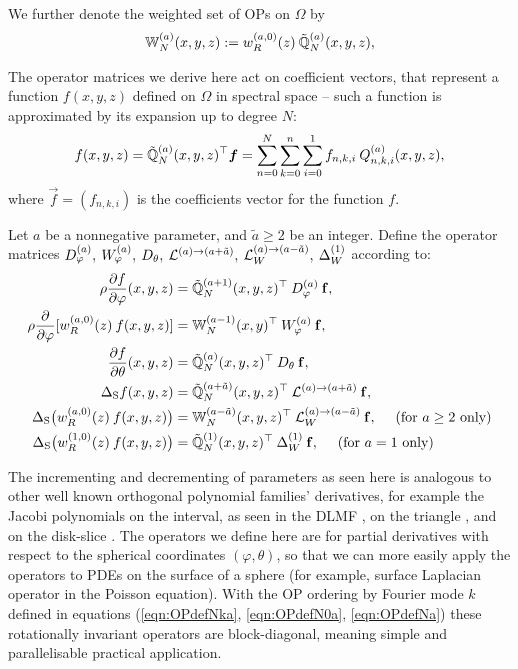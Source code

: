 \documentclass[11pt, oneside]{article}   	%
\begin{document}
We further denote the weighted set of OPs on $\Omega$ by 
\begin{align*}
	\mathbb{W}_N^{(a)}(x,y,z) := w_R^{(a,0)}(z) \: {\mathbb{\tilde Q}}^{(a)}_{N}(x,y,z),
\end{align*}

The operator matrices we derive here act on coefficient vectors, that represent a function $f(x,y,z)$ defined on $\Omega$ in spectral space -- such a function is approximated by its expansion up to degree $N$: 
\begin{align*}
	f(x,y,z) = {\mathbb{\tilde Q}}^{(a)}_{N}(x,y,z)^\top \bm{f} = \sum_{n=0}^{N} \sum_{k=0}^{n} \sum_{i=0}^{1} f_{n,k,i} \: Q_{n,k,i}^{(a)}(x,y,z),
\end{align*}
where $\vec f = (f_{n,k,i})$ is the coefficients vector for the function $f$.

\begin{definition}\label{def:differentialoperators}
	Let $a$ be a nonnegative parameter, and $\tilde a \ge 2$ be an integer. Define the operator matrices $D_\varphi^{(a)}, \: W_\varphi^{(a)}, \: D_\theta, \: \mathcal{L}^{(a)\to(a+\tilde a)}, \: \mathcal{L}_W^{(a)\to(a-\tilde a)}, \: \Delta^{(1)}_W$ according to:
\begin{align*}
	\rho {\partial f \over \partial \varphi} (x,y,z)&= {\mathbb{\tilde Q}}_N^{(a+1)}(x,y,z)^\top \: D_\varphi^{(a)} \: \mathbf{f}, \\
	\rho {\partial \over \partial \varphi}[w_R^{(a,0)}(z) \: f(x,y,z)] &= \mathbb{W}_N^{(a-1)}(x,y)^\top \: W_\varphi^{(a)}\: \mathbf{f}, \\
	{\partial f \over \partial \theta}(x,y,z) &= {\mathbb{\tilde Q}}^{(a)}_{N}(x,y,z)^\top \: D_\theta \: \mathbf{f}, \\
	\Delta_{\rm S} f(x,y,z) &= {\mathbb{\tilde Q}}_{N}^{(a+\tilde a)}(x,y,z)^\top \: \mathcal{L}^{(a)\to(a+\tilde a)} \: \mathbf{f}, \\
	\Delta_{\rm S} \big( w_R^{(a,0)}(z) \: f(x,y,z) \big) &= \mathbb{W}_N^{(a-\tilde a)}(x,y,z)^\top \: \mathcal{L}_W^{(a)\to(a-\tilde a)} \: \mathbf{f},  \quad \text{ (for } a \ge 2 \text{ only)} \\
	\Delta_{\rm S} \big( w_R^{(1,0)}(z) \: f(x,y,z) \big) &= {\mathbb{\tilde Q}}_{N}^{(1)}(x,y,z)^\top \: \Delta^{(1)}_W \: \mathbf{f}, \quad \text{ (for } a = 1 \text{ only)}
\end{align*}
\end{definition}

The incrementing and decrementing of parameters as seen here is analogous to other well known orthogonal polynomial families' derivatives, for example the Jacobi polynomials on the interval, as seen in the DLMF \cite[(18.9.3)]{DLMF}, on the triangle \cite{olver2018recurrence}, and on the disk-slice \cite{snowball2019sparse}. The operators we define here are for partial derivatives with respect to the spherical coordinates $(\varphi, \theta)$, so that we can more easily apply the operators to PDEs on the surface of a sphere (for example, surface Laplacian operator in the Poisson equation). With the OP ordering by Fourier mode $k$ defined in equations (\ref{eqn:OPdefNka}, \ref{eqn:OPdefN0a}, \ref{eqn:OPdefNa}) these rotationally invariant operators are block-diagonal, meaning simple and parallelisable practical application.
\end{document}
